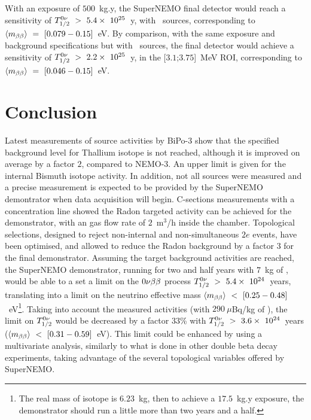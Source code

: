 With an exposure of $500$~kg.y, the SuperNEMO final detector would reach a sensitivity of $T_{1/2}^{0\nu}~>~5.4\times~10^{25}$~y, with \Se\ sources, corresponding to $\langle m_{\beta\beta}\rangle~=~[0.079-0.15]$~eV.
By comparison, with the same exposure and background specifications but with \Nd\ sources, the final detector would achieve a sensitivity of $T_{1/2}^{0\nu}~>~2.2\times~10^{25}$~y, in the [$3.1$;$3.75$]~MeV ROI, corresponding to $\langle m_{\beta\beta}\rangle~=~[0.046-0.15]$~eV.


\section{Conclusion}

Latest measurements of source activities by BiPo-$3$ show that the specified background level for Thallium isotope is not reached, although it is improved on average by a factor $2$, compared to NEMO-$3$.
An upper limit is given for the internal Bismuth isotope activity.
In addition, not all sources were measured and a precise measurement is expected to be provided by the SuperNEMO demontrator when data acquisition will begin.
C-sections measurements with a concentration line showed the Radon targeted activity can be achieved for the demonstrator, with an gas flow rate of $2$~m$^{3}$/h inside the chamber.
Topological selections, designed to reject non-internal and non-simultaneous $2e$ events, have been optimised, and allowed to reduce the Radon background by a factor $3$ for the final demonstrator.
Assuming the target background activities are reached, the SuperNEMO demonstrator, running for two and half years with $7$~kg of \Se, would be able to a set a limit on the $0\nu\beta\beta$ process $T_{1/2}^{0\nu}~>~5.4\times~10^{24}$~years, translating into a limit on the neutrino effective mass $\langle m_{\beta\beta}\rangle~<~[0.25-0.48]$~eV\footnote{The real mass of isotope is $6.23$~kg, then to achieve a $17.5$~kg.y exposure, the demonstrator should run a little more than two years and a half.}.
Taking into account the measured activities (with $290~\mu$Bq/kg of \Bi), the limit on $T_{1/2}^{0\nu}$ would be decreased by a factor $33$\% with $T_{1/2}^{0\nu}~>~3.6\times~10^{24}$~years ($\langle m_{\beta\beta}\rangle~<~[0.31-0.59]$~eV).
This limit could be enhanced by using a multivariate analysis, similarly to what is done in other double beta decay experiments, taking advantage of the several topological variables offered by SuperNEMO.

